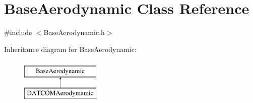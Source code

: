 \hypertarget{class_base_aerodynamic}{}\section{Base\+Aerodynamic Class Reference}
\label{class_base_aerodynamic}


{\ttfamily \#include $<$Base\+Aerodynamic.\+h$>$}

Inheritance diagram for Base\+Aerodynamic\+:\begin{figure}[H]
\begin{center}
\leavevmode
\includegraphics[height=2.000000cm]{class_base_aerodynamic}
\end{center}
\end{figure}
